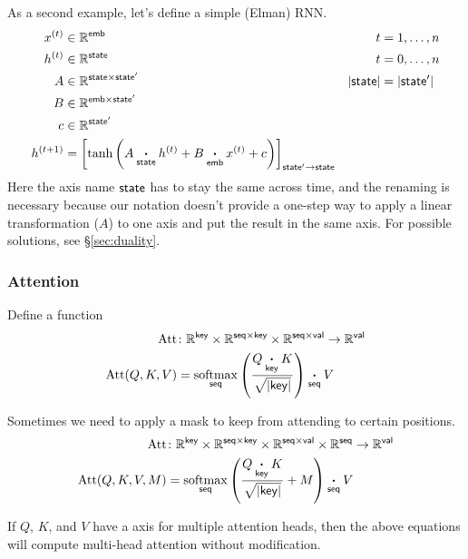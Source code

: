 \documentclass{article}
\begin{document}
As a second example, let's define a simple (Elman) RNN.
\begin{align*}
x^{(t)} &\in \mathbb{R}^{\name{emb}} & t &= 1, \ldots, n \\
h^{(t)} &\in \mathbb{R}^{\name{state}} & t &= 0, \ldots, n\\
A &\in \mathbb{R}^{\name{state} \times \name{state'}} & |\name{state}| &= |\name{state'}| \\
B &\in \mathbb{R}^{\name{emb} \times \name{state'}} \\
c &\in \mathbb{R}^{\name{state'}} \\
h^{(t+1)} &= \nmov{state'}{state}{\tanh\left( A \ndot{state} h^{(t)} + B \ndot{emb} x^{(t)} + c \right)}
\end{align*}
Here the axis name $\name{state}$ has to stay the same across time, and the renaming is necessary because our notation doesn't provide a one-step way to apply a linear transformation ($A$) to one axis and put the result in the same axis. For possible solutions, see \S\ref{sec:duality}.

\subsubsection{Attention}
\label{sec:attention}

Define a function
\begin{align*}
  \text{Att} &\colon \mathbb{R}^{\name{key}} \times \mathbb{R}^{\name{seq} \times\name{key}} \times \mathbb{R}^{\name{seq} \times\name{val}} \rightarrow \mathbb{R}^{\name{val}} \\
  \text{Att}(Q,K,V) &= \nfun{seq}{softmax} \left( \frac{Q \ndot{key} K}{\sqrt{|\name{key}|}} \right) \ndot{seq} V
\end{align*}

Sometimes we need to apply a mask to keep from attending to certain positions.
\begin{align*} 
  \text{Att} &\colon \mathbb{R}^{\name{key}} \times \mathbb{R}^{\name{seq} \times\name{key}} \times \mathbb{R}^{\name{seq} \times\name{val}} \times \mathbb{R}^{\name{seq}} \rightarrow \mathbb{R}^{\name{val}} \\
\text{Att}(Q, K, V, M) &=  \nfun{seq}{softmax} \left( \frac{Q \ndot{key} K}{\sqrt{|\name{key}|}} + M \right) \ndot{seq} V 
\end{align*}

If $Q$, $K$, and $V$ have a  axis for multiple attention heads, then the above equations will compute multi-head attention without modification.
\end{document}
